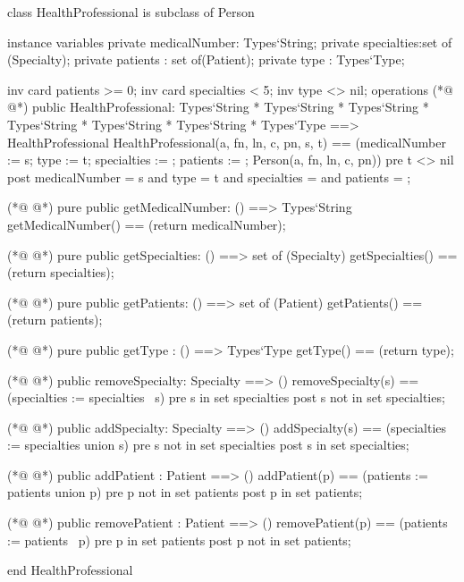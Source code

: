 \begin{vdmpp}[breaklines=true]
class HealthProfessional is subclass of Person

instance variables
  private medicalNumber: Types`String;
  private specialties:set of (Specialty);
  private patients : set of(Patient);
 private type : Types`Type;
 
 inv card patients >= 0;
  inv card specialties < 5;
 inv type <> nil;
operations
(*@
\label{HealthProfessional:13}
@*)
 public HealthProfessional: Types`String * Types`String * Types`String * Types`String * Types`String * Types`String * Types`Type ==> HealthProfessional
  HealthProfessional(a, fn, ln, c, pn, s, t) == (medicalNumber := s; type := t; specialties := {}; patients := {}; Person(a, fn, ln, c, pn))
 pre t <> nil
 post medicalNumber = s and type = t and specialties = {} and patients = {};
 
(*@
\label{getMedicalNumber:18}
@*)
 pure public getMedicalNumber: () ==> Types`String
  getMedicalNumber() == (return medicalNumber);
 
(*@
\label{getSpecialties:21}
@*)
 pure public getSpecialties: () ==> set of (Specialty)
  getSpecialties() == (return specialties);
 
(*@
\label{getPatients:24}
@*)
 pure public getPatients: () ==> set of (Patient)
  getPatients() == (return patients);
  
(*@
\label{getType:27}
@*)
 pure public getType : () ==> Types`Type
  getType() == (return type);
  
(*@
\label{removeSpecialty:30}
@*)
 public removeSpecialty: Specialty ==> ()
  removeSpecialty(s) == (specialties := specialties \ {s})
 pre s in set specialties
 post s not in set specialties;
  
(*@
\label{addSpecialty:35}
@*)
 public addSpecialty: Specialty ==> ()
  addSpecialty(s) == (specialties := specialties union {s})
 pre s not in set specialties
 post s in set specialties;
 
(*@
\label{addPatient:40}
@*)
 public addPatient : Patient ==> ()
  addPatient(p) == (patients :=  patients union {p})
 pre p not in set patients
 post p in set patients;
 
(*@
\label{removePatient:45}
@*)
 public removePatient : Patient ==> ()
  removePatient(p) == (patients := patients \ {p})
 pre p in set patients
 post p not in set patients;

end HealthProfessional
\end{vdmpp}
\bigskip
